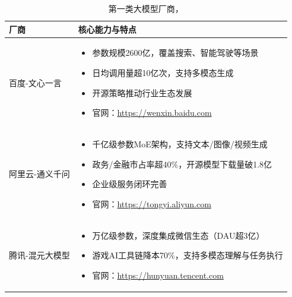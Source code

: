 \documentclass{article}
\begin{document}
\begin{table}[htbp]
  \centering
  \begin{tabular}{|p{3cm}|p{12cm}|}
    \hline
    \textbf{厂商} & \textbf{核心能力与特点} \\
    \hline
    百度-文心一言 &
    \begin{itemize}
      \item 参数规模2600亿，覆盖搜索、智能驾驶等场景
      \item 日均调用量超10亿次，支持多模态生成
      \item 开源策略推动行业生态发展
      \item 官网：\url{https://wenxin.baidu.com}
    \end{itemize} \\
    \hline
    阿里云-通义千问 &
    \begin{itemize}
      \item 千亿级参数MoE架构，支持文本/图像/视频生成
      \item 政务/金融市占率超40\%，开源模型下载量破1.8亿
      \item 企业级服务闭环完善
      \item 官网：\url{https://tongyi.aliyun.com}
    \end{itemize} \\
    \hline
    腾讯-混元大模型 &
    \begin{itemize}
      \item 万亿级参数，深度集成微信生态（DAU超3亿）
      \item 游戏AI工具链降本70\%，支持多模态理解与任务执行
      \item 官网：\url{https://hunyuan.tencent.com}
    \end{itemize} \\
    \hline
  \end{tabular}
  \caption{第一类大模型厂商，}
\end{table}
\end{document}
